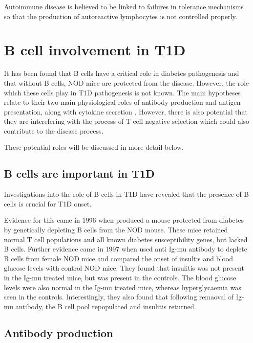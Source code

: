 Autoimmune disease is believed to be linked to failures in tolerance mechanisms so that the production of autoreactive lymphocytes is not controlled properly.



\section{B cell involvement in T1D}
\label{sec:BcellsinT1D}

It has been found that B cells have a critical role in diabetes pathogenesis and that without B cells, NOD mice are protected from the disease.
However, the role which these cells play in T1D pathogenesis is not known.
The main hypotheses relate to their two main physiological roles of antibody production and antigen presentation, along with cytokine secretion \citep{Hinman2014}.
However, there is also potential that they are interefering with the process of T cell negative selection which could also contribute to the disease process.

These potential roles will be discussed in more detail below.

\subsection{B cells are important in T1D}

Investigations into the role of B cells in T1D have revealed that the presence of B cells is crucial for T1D onset.

Evidence for this came in 1996 when \citet{Serreze1996} produced a mouse protected from diabetes by genetically depleting B cells from the NOD mouse.
These mice retained normal T cell populations and all known diabetes susceptibility genes, but lacked B cells.
Further evidence came in 1997 when \citet{Noorchasm1997} used anti Ig-mu antibody to deplete B cells from female NOD mice and compared the onset of insultis and blood glucose levels with control NOD mice.
They found that insulitis was not present in the Ig-mu treated mice, but was present in the controls.
The blood glucose levels were also normal in the Ig-mu treated mice, whereas hyperglycaemia was seen in the controls.
Interestingly, they also found that following remaoval of Ig-mu antibody, the B cell pool repopulated and insulitis returned.



\subsection{Antibody production}


